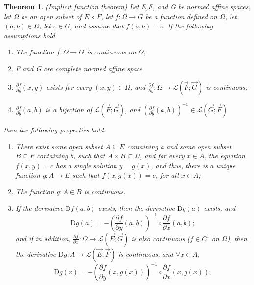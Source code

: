 \documentclass[a4paper,12pt]{report}
\newtheorem{theorem}{Theorem}[section]
\begin{document}
\begin{theorem}
    (Implicit function theorem\cite{gallier2019algebra}) Let E,F, and G be normed affine spaces, let $\Omega$ be an open subset of $E\times F$, let $f:\Omega\to G$ be a function defined on $\Omega$, let $(a,b)\in \Omega$, let $c\in G$, and assume that $f(a,b)=c$. If the following assumptions hold
    \begin{enumerate}[label={(\arabic*)}]
        \item The function $f:\Omega\to G$ is continuous on $\Omega$;
        \item F and G are complete normed affine space
        \item $\frac{\partial f}{\partial y}(x,y)$ exists for every $(x,y)\in \Omega$, and $\frac{\partial f}{\partial y}:\Omega\to\mathcal L (\vec F;\vec G)$ is continuous;
        \item $\frac{\partial f}{\partial y}(a,b)$ is a bijection of $\mathcal L (\vec F;\vec G)$, and $\left(\frac{\partial f}{\partial y}(a,b)\right)^{-1} \in \mathcal L (\vec G;\vec F)$
    \end{enumerate}
    then the following properties hold:
    \begin{enumerate}[label={(\alph*)}]
        \item There exist some open subset $A\subseteq E$ containing a and some open subset $B\subseteq F$ containing b, such that $A\times B\subseteq \Omega$, and for every $x\in A$, the equation $f(x,y)=c$ has a single solution $y=g(x)$, and thus, there is a unique function $g:A\to B$ such that $f(x,g(x))=c$, for all $x\in A$;
        \item The function $g:A\in B$ is continuous.
        \item If the derivative $\mathrm D f(a,b)$ exists, then the derivative $\mathrm D g(a)$ exists, and 
            \[
                \mathrm D g(a)=-\left( \frac{\partial f}{\partial y} (a,b)\right)^{-1} \circ \frac{\partial f}{\partial x} (a,b);
            \]
            and if in addition, $\frac{\partial f}{\partial x}:\Omega\to\mathcal L (\vec E;\vec G)$ is also continuous ($f\in C^1$ on $\Omega$), then the derivative $\mathrm D g:A\to \mathcal L (\vec E; \vec F)$ is continuous, and $\forall x\in A$, 
            \[
                \mathrm D g(x)=-\left( \frac{\partial f}{\partial y} (x,g(x))\right)^{-1} \circ \frac{\partial f}{\partial x} (x,g(x));
            \]

    \end{enumerate}
\end{theorem}
\end{document}
